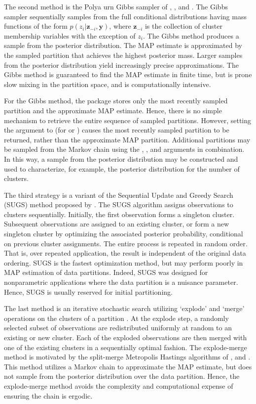 \documentclass[article, nojss]{jss}
\newcommand{\bz}{\boldsymbol{z}}
\newcommand{\by}{\boldsymbol{y}}
\begin{document}
The second method is the Polya urn Gibbs sampler of \citet{MacEachern1994}, \citet{BushMacEachern1996}, and \citet{MacEachernMuller1998}. The Gibbs sampler sequentially samples from the full conditional distributions having mass functions of the form $p(z_i|\bz_{-i},\by)$, where $\bz_{-i}$ is the collection of cluster membership variables with the exception of $z_i$. The Gibbs method produces a sample from the posterior distribution. The MAP estimate is approximated by the sampled partition that achieves the highest posterior mass. Larger samples from the posterior distribution yield increasingly precise approximations. The Gibbs method is guaranteed to find the MAP estimate in finite time, but is prone slow mixing in the partition space, and is computationally intensive.

For the Gibbs method, the  package stores only the most recently sampled partition and the approximate MAP estimate. Hence, there is no simple mechanism to retrieve the entire sequence of sampled partitions. However, setting the  argument to  (for  or ) causes the most recently sampled partition to be returned, rather than the approximate MAP partition. Additional partitions may be sampled from the Markov chain using the , , and  arguments in combination. In this way, a sample from the posterior distribution may be constructed and used to characterize, for example, the posterior distribution for the number of clusters.

The third strategy is a variant of the Sequential Update and Greedy Search (SUGS) method proposed by \citet{WangDunson2010}. The SUGS algorithm assigns observations to clusters sequentially. Initially, the first observation forms a singleton cluster. Subsequent observations are assigned to an existing cluster, or form a new singleton cluster by optimizing the associated posterior probability, conditional on previous cluster assignments. The entire process is repeated in random order. That is, over repeated application, the result is independent of the original data ordering. SUGS is the fastest optimization method, but may perform poorly in MAP estimation of data partitions. Indeed, SUGS was designed for nonparametric applications where the data partition is a nuisance parameter. Hence, SUGS is usually reserved for initial partitioning.

The last method is an iterative stochastic search utilizing `explode' and `merge' operations on the clusters of a partition \citep{ShotwellSlate2011}. At the explode step, a randomly selected subset of observations are redistributed uniformly at random to an existing or new cluster. Each of the exploded observations are then merged with one of the existing clusters in a sequentially optimal fashion. The explode-merge method is motivated by the split-merge Metropolis Hastings algorithms of \citet{GreenRichardson2001}, and \citet{JainNeal2004, JainNeal2007}. This method utilizes a Markov chain to approximate the MAP estimate, but does not sample from the posterior distribution over the data partition. Hence, the explode-merge method avoids the complexity and computational expense of ensuring the chain is ergodic. 
\end{document}
